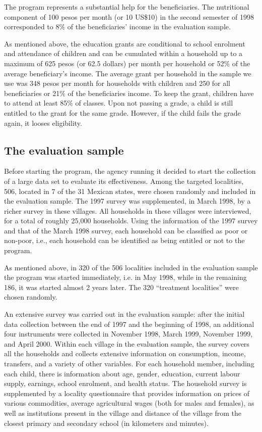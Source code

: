 \documentclass{handoutForSolutions}
\begin{document}
The program represents a substantial help for the beneficiaries. The nutritional component of 100 pesos per month (or 10 US\$10) in the second semester of 1998 corresponded to 8\% of the beneficiaries’ income in the evaluation sample.

As mentioned above, the education grants are conditional to school enrolment and attendance of children and can be cumulated within a household up to a maximum of 625 pesos (or 62.5 dollars) per month per household or 52\% of the average beneficiary’s income. The average grant per household in the sample we use was 348 pesos per month for households with children and 250 for all beneficiaries or 21\% of the beneficiaries income. To keep the grant, children have to attend at least 85\% of classes. Upon not passing a grade, a child is still entitled to the grant for the same grade. However, if the child fails the grade again, it looses eligibility.



\subsection{The evaluation sample}
Before starting the program, the agency running it decided to start the collection of a large data set to evaluate its effectiveness. Among the targeted localities, 506, located in 7 of the 31 Mexican states, were chosen randomly and included in the evaluation sample. The 1997 survey was supplemented, in March 1998, by a richer survey in these villages. All households in these villages were interviewed, for a total of roughly 25,000 households. Using the information of the 1997 survey and that of the March 1998 survey, each household can be classified as poor or non-poor, i.e., each household can be identified as being entitled or not to the program.

As mentioned above, in 320 of the 506 localities included in the evaluation sample the program was started immediately, i.e. in May 1998, while in the remaining 186, it was started almost 2 years later. The 320 “treatment localities” were chosen randomly.

An extensive survey was carried out in the evaluation sample: after the initial data collection between the end of 1997 and the beginning of 1998, an additional four instruments were collected in November 1998, March 1999, November 1999, and April 2000. Within each village in the evaluation sample, the survey covers all the households and collects extensive information on consumption, income, transfers, and a variety of other variables. For each household member, including each child, there is information about age, gender, education, current labour supply, earnings, school enrolment, and health status. The household survey is supplemented by a locality questionnaire that provides information on prices of various commodities, average agricultural wages (both for males and females), as well as institutions present in the village and distance of the village from the closest primary and secondary school (in kilometers and minutes).
\end{document}

